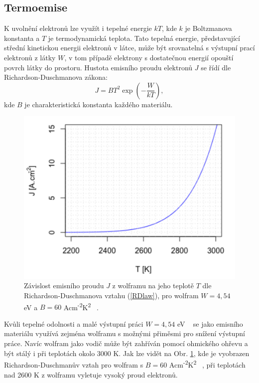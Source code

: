 \subsection{Termoemise}
K uvolnění elektronů lze využít i tepelné energie $kT$, kde $k$ je Boltzmanova konstanta a $T$ je termodynamická teplota. Tato tepelná energie, představující střední kinetickou energii elektronů v látce, může být srovnatelná s výstupní prací elektronů z látky $W$, v tom případě elektrony s dostatečnou energií opouští povrch látky do prostoru. Hustota emisního proudu elektronů $J$ se řídí dle Richardson-Duschmanova zákona:
\begin{equation}
	J=BT^2\exp(-\frac{W}{kT}),
	\label{RDlaw}
\end{equation}
kde $B$ je charakteristická konstanta každého materiálu. 
\begin{figure}[htbp!]
	\centering
	\includegraphics[width = 350 pt]{WolframGraf.png}
	\caption{Závislost emisního proudu $J$ z wolframu na jeho teplotě $T$ dle Richardson-Duschmanova vztahu (\ref{RDlaw}), pro wolfram $W=4,54$ eV a $B=60$ Acm\textsuperscript{-2}K\textsuperscript{2} ~\cite{zdrojwolf}.}
	\label{WolframGraf}
\end{figure}
\par Kvůli tepelné odolnosti a malé výstupní práci $W=4,54$ eV ~\cite{zdrojwolf} se jako emisního materiálu využívá zejména wolframu s možnými přiměsmi pro snížení výstupní práce. Navíc wolfram jako vodič může být zahříván pomocí ohmického ohřevu a být stálý i při teplotách okolo 3000 K. Jak lze vidět na Obr. \ref{WolframGraf}, kde je vyobrazen Richardson-Duschmanův vztah pro wolfram s $B=60$ Acm\textsuperscript{-2}K\textsuperscript{2} ~\cite{zdrojwolf}, při teplotách nad 2600 K z wolframu vyletuje vysoký proud elektronů. 

